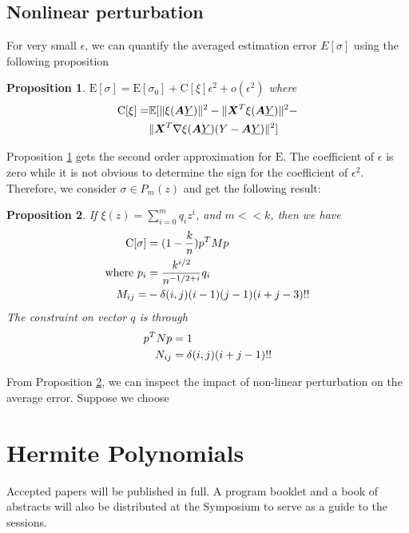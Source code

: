 \documentclass[conference,letterpaper]{IEEEtran}
\newtheorem{proposition}{Proposition}
\DeclarePairedDelimiter\norm{\lVert}{\rVert}
\def\E{\mathbb{E}}
\begin{document}
\subsection{Nonlinear perturbation}
For very small $\epsilon$, we can quantify the averaged estimation error $E[\sigma]$ using the
following proposition
\begin{proposition}\label{prop:Esigma}
$\mathrm{E}[\sigma] = \mathrm{E}[\sigma_0] +
\mathrm{C}[\xi]\epsilon^2 + o(\epsilon^2)$
where
\begin{align}\notag
\mathrm{C}[\xi]= & \E[\norm{\xi(\bm{A}\underline{Y})}^2 -
\norm{\bm{X}^T\xi(\bm{A}\underline{Y})}^2 - \\
&\norm{\bm{X}^T \nabla\xi(\bm{A}\underline{Y})(Y-\bm{A}\underline{Y})}^2]
\end{align}
\end{proposition}
Proposition \ref{prop:Esigma} gets the second order approximation for $\mathrm{E}$.
The coefficient of $\epsilon$ is zero while it is not obvious to determine the sign for 
the coefficient of $\epsilon^2$. Therefore, we consider $\sigma \in P_m(z)$ and
get the following result:
\begin{proposition}\label{prop:quadratic}
If
$\xi(z) = \sum_{i=0}^m q_i z^i$,
and $m << k$, then we have 
\begin{align}
\mathrm{C}[\sigma] &= (1-\frac{k}{n}) p^T M p \notag\\
\textrm{where }p_i &= \frac{k^{i/2}}{n^{- 1/2 + i}}q_i \notag\\
M_{ij} =& -\delta(i,j)(i-1)(j-1)(i+j-3)!! 
\end{align}
The constraint on vector $q$ is through
\begin{align}
p^T N p & = 1 \notag\\
N_{ij}  & = \delta(i,j)(i+j-1)!!
\end{align}
\end{proposition}

From Proposition \ref{prop:quadratic}, we can inspect the impact of non-linear perturbation on the average error. Suppose we choose 

\section{Hermite Polynomials}\label{sec:hp}

Accepted papers will be published in full. 
A program booklet and a book of abstracts will also be
distributed at the Symposium to serve as a guide to the sessions.
\end{document}
